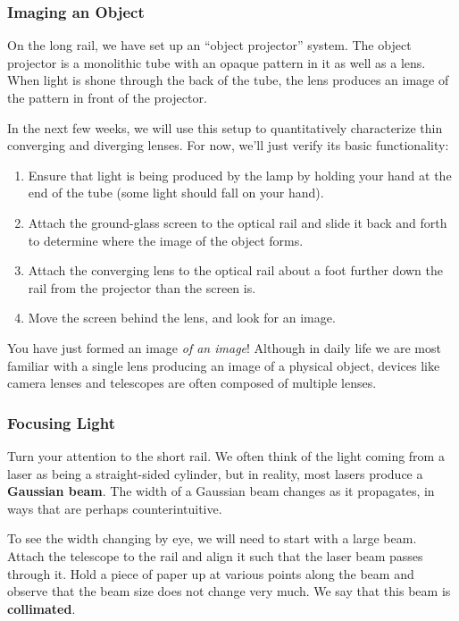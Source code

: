 \documentclass[]{manual}
\begin{document}
    \subsubsection{Imaging an Object}

    On the long rail, we have set up an ``object projector'' system.
    The object projector is a monolithic tube with an opaque pattern in it as well as a lens.
    When light is shone through the back of the tube, the lens produces an image of the pattern in front of the projector.

    In the next few weeks, we will use this setup to quantitatively characterize thin converging and diverging lenses.
    For now, we'll just verify its basic functionality:
    \begin{enumerate}
        \item Ensure that light is being produced by the lamp by holding your hand at the end of the tube (some light should fall on your hand).
        \item Attach the ground-glass screen to the optical rail and slide it back and forth to determine where the image of the object forms.
        \item Attach the converging lens to the optical rail about a foot further down the rail from the projector than the screen is.
        \item Move the screen behind the lens, and look for an image.
    \end{enumerate}

    You have just formed an image \textit{of an image}!
    Although in daily life we are most familiar with a single lens producing an image of a physical object, devices like camera lenses and telescopes are often composed of multiple lenses.


    \subsubsection{Focusing Light}

    Turn your attention to the short rail.
    We often think of the light coming from a laser as being a straight-sided cylinder, but in reality, most lasers produce a \textbf{Gaussian beam}.
    The width of a Gaussian beam changes as it propagates, in ways that are perhaps counterintuitive.

    To see the width changing by eye, we will need to start with a large beam.
    Attach the telescope to the rail and align it such that the laser beam passes through it.
    Hold a piece of paper up at various points along the beam and observe that the beam size does not change very much.
    We say that this beam is \textbf{collimated}.
\end{document}
